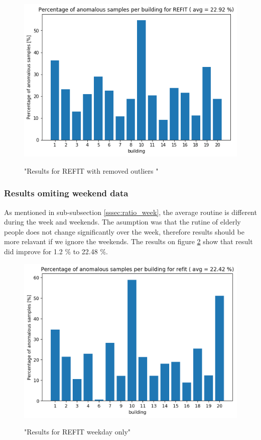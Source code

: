 \begin{figure}[H]
	\centering
	\caption{"Results for REFIT with removed outliers "}
	\includegraphics[width=1\textwidth]{Figures/EC/refit_res2.png}
	\label{fig:refit_res2}
\end{figure}

\subsubsection{Results omiting weekend data}

As mentioned in sub-subsection \ref{sssec:ratio_week}, the average routine is different during the week and weekends.
The asumption was that the rutine of elderly people does not change significantly over the week, therefore results should be more relavant if we ignore the weekends.
The results on figure \ref{fig:refit_res_nw_1"} show that result did improve for 1.2 \% to 22.48 \%.

\begin{figure}[H]
	\centering
	\caption{"Results for REFIT weekday only"}
	\includegraphics[width=1\textwidth]{Figures/EC/refit_res_nw_1.png}
	\label{fig:refit_res_nw_1"}
\end{figure}

